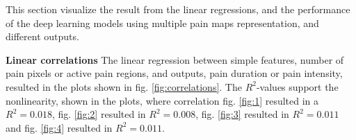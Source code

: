 This section visualize the result from the linear regressions, and the performance of the deep learning models using multiple pain maps representation, and different outputs. \newline

\noindent
\textbf{Linear correlations}\newline
The linear regression between simple features, number of pain pixels or active pain regions, and outputs, pain duration or pain intensity, resulted in the plots shown in fig. \ref{fig:correlations}. The $R^2$-values support the nonlinearity, shown in the plots, where correlation fig. \ref{fig:1} resulted in a $R^2 = 0.018$, fig. \ref{fig:2} resulted in $R^2 = 0.008$, fig. \ref{fig:3} resulted in $R^2 = 0.011$ and fig. \ref{fig:4} resulted in $R^2 =  0.011$. \\

